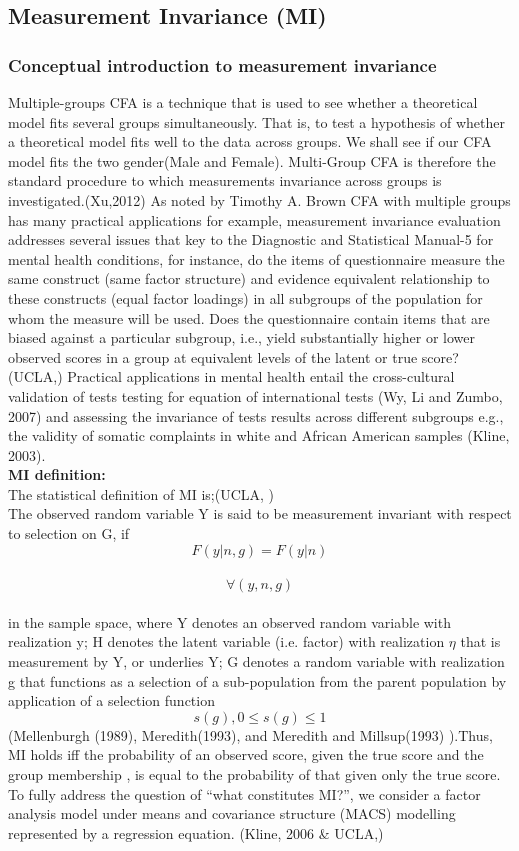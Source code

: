 \documentclass[12pt]{article}
\begin{document}
\subsection{Measurement Invariance (MI)}
\subsubsection{Conceptual introduction to measurement invariance}
Multiple-groups CFA is a technique that is used to see whether a theoretical model fits several groups simultaneously. That is, to test a hypothesis of whether a theoretical model fits well to the data across groups. We shall see if our CFA model fits the two gender(Male and Female).
Multi-Group CFA is therefore the standard procedure to which measurements invariance across groups is investigated.(Xu,2012) As noted by Timothy A. Brown CFA with multiple groups has many practical applications for example, measurement invariance evaluation addresses several issues that key to the Diagnostic and Statistical Manual-5 for mental health conditions, for instance, do the items of questionnaire measure the same construct (same factor structure) and evidence equivalent relationship to these constructs (equal factor loadings) in all subgroups of the population for whom the measure will be used. Does the questionnaire contain items that are biased against a particular subgroup, i.e., yield substantially higher or lower observed scores in a group at equivalent levels of the latent or true score? (UCLA,) Practical applications in mental health entail the cross-cultural validation of tests testing for equation of international tests (Wy, Li and Zumbo, 2007) and assessing the invariance of tests results across different subgroups e.g., the validity of somatic complaints in white and African American samples (Kline, 2003).\\

\noindent\textbf{MI definition:}\\

\noindent The statistical definition of MI is;(UCLA, ) \\
The observed random variable Y is said to be measurement invariant with respect to selection on G, 
if $$F(y|n,g)=F(y|n)$$ \\
$$ \forall (y,n, g)$$\\

\noindent in the sample space, where Y denotes an observed random variable with realization y; H denotes the latent variable (i.e. factor) with realization $\eta$ that is measurement by Y, or underlies Y; G denotes a random variable with realization g that functions as a selection of a sub-population from the parent population by application of a selection function
$$s(g), 0\leq s(g)\leq 1$$
\newpage
\noindent(Mellenburgh (1989), Meredith(1993), and Meredith and Millsup(1993) ).Thus, MI holds iff the probability of an observed score, given the true score and the group membership , is equal to the probability of that given only the true score. To fully address the question of “what constitutes MI?”, we consider a factor analysis model under means and covariance structure (MACS) modelling represented by a regression equation. (Kline, 2006 \& UCLA,) 
\end{document}
